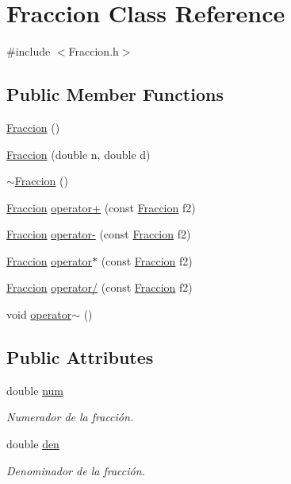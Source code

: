 \hypertarget{class_fraccion}{\section{Fraccion Class Reference}
\label{class_fraccion}
}


{\ttfamily \#include $<$Fraccion.\+h$>$}

\subsection*{Public Member Functions}
\begin{DoxyCompactItemize}
\item 
\hyperlink{class_fraccion_a80b8bb475192ceb820428a57e911ceb5}{Fraccion} ()
\item 
\hyperlink{class_fraccion_a3e1003b9ae321c94a95081f5346ab8b8}{Fraccion} (double n, double d)
\item 
\hyperlink{class_fraccion_abb2ec579092e5bc50e7c3644ea718084}{$\sim$\+Fraccion} ()
\item 
\hyperlink{class_fraccion}{Fraccion} \hyperlink{class_fraccion_ad9e6571b18acafd30480d2edacc5ecf5}{operator+} (const \hyperlink{class_fraccion}{Fraccion} f2)
\item 
\hyperlink{class_fraccion}{Fraccion} \hyperlink{class_fraccion_aa200891863fbeb110bf28e23d639e468}{operator-\/} (const \hyperlink{class_fraccion}{Fraccion} f2)
\item 
\hyperlink{class_fraccion}{Fraccion} \hyperlink{class_fraccion_a0857d8edad85059f5976b4b962ae800c}{operator$\ast$} (const \hyperlink{class_fraccion}{Fraccion} f2)
\item 
\hyperlink{class_fraccion}{Fraccion} \hyperlink{class_fraccion_abc2f6f83bee7cea70a689cdbf9bbd840}{operator/} (const \hyperlink{class_fraccion}{Fraccion} f2)
\item 
void \hyperlink{class_fraccion_a6ba2dac78e5ef60d6860d39ba3489bb1}{operator$\sim$} ()
\end{DoxyCompactItemize}
\subsection*{Public Attributes}
\begin{DoxyCompactItemize}
\item 
double \hyperlink{class_fraccion_a1c4a5b2bc4a188ba06efbc84a21d72e9}{num}
\begin{DoxyCompactList}\small\item\em Numerador de la fracción. \end{DoxyCompactList}\item 
double \hyperlink{class_fraccion_a7bb085aa596736964bf6444c974a2913}{den}
\begin{DoxyCompactList}\small\item\em Denominador de la fracción. \end{DoxyCompactList}\end{DoxyCompactItemize}


